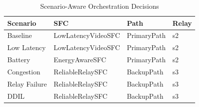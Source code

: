 \begin{table}[t]
\caption{Scenario-Aware Orchestration Decisions}
\label{tab:orchestration}
\centering
\small
\begin{tabular}{llll}
\toprule
Scenario & SFC & Path & Relay \\
\midrule
Baseline & LowLatencyVideoSFC & PrimaryPath & s2 \\
Low Latency & LowLatencyVideoSFC & PrimaryPath & s2 \\
Battery & EnergyAwareSFC & PrimaryPath & s2 \\
Congestion & ReliableRelaySFC & BackupPath & s3 \\
Relay Failure & ReliableRelaySFC & BackupPath & s3 \\
DDIL & ReliableRelaySFC & BackupPath & s3 \\
\bottomrule
\end{tabular}
\end{table}